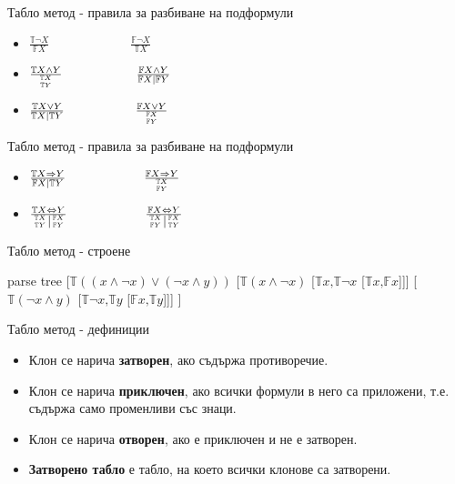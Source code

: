 \documentclass[14pt, aspectratio=169]{beamer}
\newcommand\ST{\mathbb{T}}
\newcommand\SF{\mathbb{F}}
\begin{document}
\begin{frame}{Табло метод - правила за разбиване на подформули}
	\begin{itemize}
	\LARGE
		\item<1-> $\frac{\ST \neg X}{\SF X}\;\;\;\;\;\;\;\;\;\;\;\;\;\;\;\;\;\;\;\;\;\;\ \frac{\SF \neg X}{\ST X}$
		\\ [8mm]
		\item<2-> $\frac{\ST X \land Y}{{\ST X \atop \ST Y}} \;\;\;\;\;\;\;\;\;\;\;\;\;\;\;\;\;\;\;\;\; \frac{\SF X \land Y}{\SF X \mid \SF Y}$
		\\ [8mm]
		\item<3-> $\frac{\ST X \lor Y}{\ST X \mid \ST Y} \;\;\;\;\;\;\;\;\;\;\;\;\;\;\;\;\;\;\;\ \frac{\SF X \lor Y}{{\SF X \atop \SF Y}}$
	\normalsize
	\end{itemize}
\end{frame}

\begin{frame}{Табло метод - правила за разбиване на подформули}
	\begin{itemize}
	\LARGE
		\item<1-> $\frac{\ST X \Rightarrow Y}{\SF X \mid \ST Y} \;\;\;\;\;\;\;\;\;\;\;\;\;\;\;\;\;\;\;\;\;\ \frac{\SF X \Rightarrow Y}{{\ST X \atop \SF Y}}$
		\\ [8mm]
		\item<2-> $\frac{\ST X \Leftrightarrow Y}{\left.{\ST X \atop \ST Y}\right\vert{\SF X \atop \SF Y}} \;\;\;\;\;\;\;\;\;\;\;\;\;\;\;\;\;\;\;\;\;\ \frac{\SF X \Leftrightarrow Y}{\left.{\ST X \atop \SF Y}\right\vert{\SF X \atop \ST Y}}$
	\normalsize
	\end{itemize}
\end{frame}

\begin{frame}{Табло метод - строене}
	\begin{center}
	\begin{forest}
		parse tree
		[$\ST ((x \land \neg x) \lor (\neg x \land y))$
			[$\ST (x \land \neg x)$ [$\ST x \mbox{,} \ST \neg x$ [$\ST x \mbox{,} \SF x$]]]
			[$\ST (\neg x \land y)$ [$\ST \neg  x \mbox{,} \ST y$ [$\SF x \mbox{,} \ST y$]]]
		]
	\end{forest}
	\end{center}
\end{frame}

\begin{frame}{Табло метод - дефиниции}
	\begin{itemize}
		\item<1-> Клон се нарича \textbf{затворен}, ако съдържа противоречие.
		\item<2-> Клон се нарича \textbf{приключен}, ако всички формули в него са приложени, т.е. съдържа само променливи със знаци.
		\item<3-> Клон се нарича \textbf{отворен}, ако е приключен и не е затворен.
		\item<4-> \textbf{Затворено табло} е табло, на което всички клонове са затворени.
	\end{itemize}
\end{frame}
\end{document}
